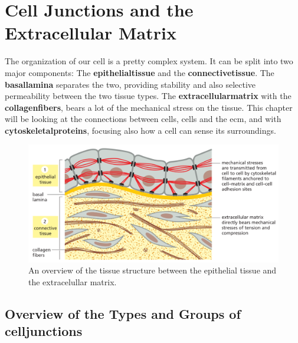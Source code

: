 \documentclass[../main.tex]{subfiles}
\begin{document}
	
\section{Cell Junctions and the Extracellular Matrix}

The organization of our cell is a pretty complex system. It can be split into two major components: The \textbf{\gls{epithelialtissue}} and the \textbf{\gls{connectivetissue}}. The \textbf{\gls{basallamina}} separates the two, providing stability and also selective permeability between the two tissue types. The \textbf{\gls{extracellularmatrix}} with the \textbf{\gls{collagenfibers}}, bears a lot of the mechanical stress on the tissue. This chapter will be looking at the connections between cells, cells and the ecm, and with \textbf{\gls{cytoskeletalproteins}}, focusing also how a cell can sense its surroundings.

\begin{figure}[H]
	\centering
	\includegraphics[width=0.7\linewidth]{tiss_overview}
	\caption{An overview of the tissue structure between the epithelial tissue and the extracelullar matrix.}
	\label{fig:tissoverview}
\end{figure}


\subsection{Overview of the Types and Groups of \gls{celljunctions}}
\end{document}
